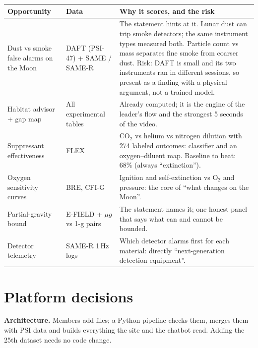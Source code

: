 \documentclass[10pt,a4paper]{article}
\begin{document}
\begin{tabularx}{\linewidth}{@{}p{3.3cm}p{3.3cm}L@{}}
\toprule
\textbf{Opportunity} & \textbf{Data} & \textbf{Why it scores, and the risk}\\
\midrule
Dust vs smoke false alarms on the Moon & DAFT (PSI-47) + SAME / SAME-R & The statement hints at it. Lunar dust can trip smoke detectors; the same instrument types measured both. Particle count vs mass separates fine smoke from coarser dust. Risk: DAFT is small and its two instruments ran in different sessions, so present as a finding with a physical argument, not a trained model.\\
Habitat advisor + gap map & All experimental tables & Already computed; it is the engine of the leader's flow and the strongest 5 seconds of the video.\\
Suppressant effectiveness & FLEX & CO$_2$ vs helium vs nitrogen dilution with 274 labeled outcomes: classifier and an oxygen--diluent map. Baseline to beat: 68\% (always ``extinction'').\\
Oxygen sensitivity curves & BRE, CFI-G & Ignition and self-extinction vs O$_2$ and pressure: the core of ``what changes on the Moon''.\\
Partial-gravity bound & E-FIELD + $\mu g$ vs 1-g pairs & The statement names it; one honest panel that says what can and cannot be bounded.\\
Detector telemetry & SAME-R 1\,Hz logs & Which detector alarms first for each material: directly ``next-generation detection equipment''.\\
\bottomrule
\end{tabularx}

\section{Platform decisions}

\textbf{Architecture.} Members add files; a Python pipeline checks them, merges them with PSI data and builds everything the site and the chatbot read. Adding the 25th dataset needs no code change.
\end{document}
